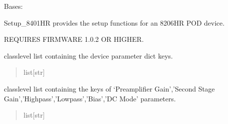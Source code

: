 \documentclass[letterpaper,10pt,english]{sphinxmanual}
\begin{document}
\begin{fulllineitems}
\label{\detokenize{Setup_8401HR:Setup_8401HR.Setup_8401HR}}
\pysigstartsignatures
{}
\pysigstopsignatures
\sphinxAtStartPar
Bases: {\hyperref[\detokenize{Setup_PodInterface:Setup_PodInterface.Setup_Interface}]{}}

\sphinxAtStartPar
Setup\_8401HR provides the setup functions for an 8206\sphinxhyphen{}HR POD device.

\sphinxAtStartPar
REQUIRES FIRMWARE 1.0.2 OR HIGHER.

\begin{fulllineitems}
\label{\detokenize{Setup_8401HR:Setup_8401HR.Setup_8401HR._PARAMKEYS}}
\pysigstartsignatures
{}
\pysigstopsignatures
\sphinxAtStartPar
class\sphinxhyphen{}level list containing the device parameter dict keys.
\begin{quote}\begin{description}
\sphinxAtStartPar
list{[}str{]}

\end{description}\end{quote}

\end{fulllineitems}


\begin{fulllineitems}
\label{\detokenize{Setup_8401HR:Setup_8401HR.Setup_8401HR._CHANNELKEYS}}
\pysigstartsignatures
{}
\pysigstopsignatures
\sphinxAtStartPar
class\sphinxhyphen{}level list containing the keys of ‘Preamplifier Gain’,’Second Stage Gain’,’High\sphinxhyphen{}pass’,’Low\sphinxhyphen{}pass’,’Bias’,’DC Mode’ parameters.
\begin{quote}\begin{description}
\sphinxAtStartPar
list{[}str{]}

\end{description}\end{quote}


\end{fulllineitems}
\end{fulllineitems}
\end{document}
